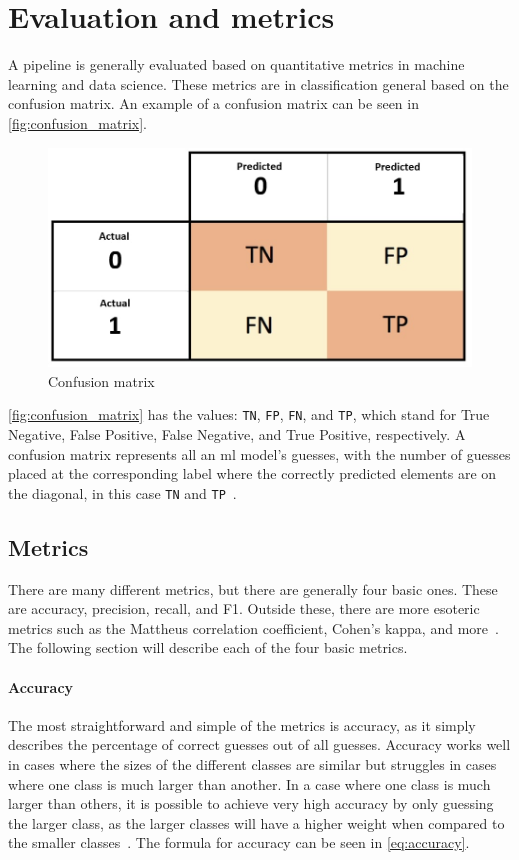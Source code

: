 \section{Evaluation and metrics}\label{sec:evalueation}
A pipeline is generally evaluated based on quantitative metrics in machine learning and data science. These metrics are in classification general based on the confusion matrix. An example of a confusion matrix can be seen in \autoref{fig:confusion_matrix}.

\begin{figure}[htb!]
    \centering
    \includegraphics[scale=0.3]{figures/Confusion_Matrix.jpg}
    \caption{Confusion matrix~\cite{confusion-matrix}}
    \label{fig:confusion_matrix}
\end{figure}

\autoref{fig:confusion_matrix} has the values: \texttt{TN}, \texttt{FP}, \texttt{FN}, and \texttt{TP}, which stand for True Negative, False Positive, False Negative, and True Positive, respectively.
A confusion matrix represents all an \gls{ml} model's guesses, with the number of guesses placed at the corresponding label where the correctly predicted elements are on the diagonal, in this case \texttt{TN} and \texttt{TP}~\cite{james-statistical-learning}.

\subsection{Metrics}\label{subsec:metrics}
There are many different metrics, but there are generally four basic ones. These are accuracy, precision, recall, and F1. Outside these, there are more esoteric metrics such as the Mattheus correlation coefficient, Cohen's kappa, and more~\cite{metrics-for-multi}. The following section will describe each of the four basic metrics.

\paragraph{Accuracy} The most straightforward and simple of the metrics is accuracy, as it simply describes the percentage of correct guesses out of all guesses. Accuracy works well in cases where the sizes of the different classes are similar but struggles in cases where one class is much larger than another. In a case where one class is much larger than others, it is possible to achieve very high accuracy by only guessing the larger class, as the larger classes will have a higher weight when compared to the smaller classes~\cite{metrics-for-multi}. The formula for accuracy can be seen in \ref{eq:accuracy}.

